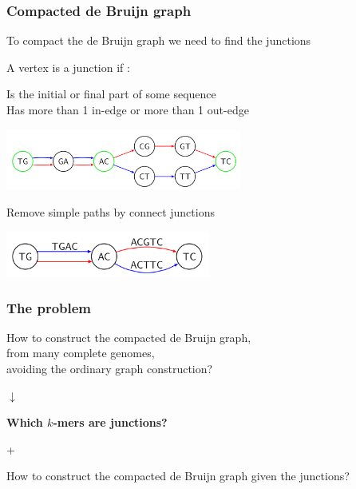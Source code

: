 \begin{frame}
	\frametitle{Compacted de Bruijn graph}
	\centering
	
  To compact the de Bruijn graph we need to find the junctions
  
  \medskip
  
  A vertex is a junction if :
  
  Is the initial or final part of some sequence\\
  Has more than 1 in-edge or more than 1 out-edge\\
	
	\medskip

	\includegraphics[height=2cm]{images/debruin-3a}

  \pause

	\medskip

  Remove simple paths by connect junctions  	

	\medskip

	\includegraphics[height=1.5cm]{images/debruin-4}
	
\end{frame}




\begin{frame}
	\frametitle{The problem}
	\centering
	
	How to construct the compacted de Bruijn graph,\\ from many complete genomes,\\ avoiding the ordinary graph construction?
	
	\pause
	
	\medskip
	
	$\downarrow$
	
	\medskip

  
  \textbf{Which $k$-mers are junctions?}
  
  \medskip
  
  +
  
  \medskip
  
  How to construct the compacted de Bruijn graph given the junctions?
  
	
\end{frame}
